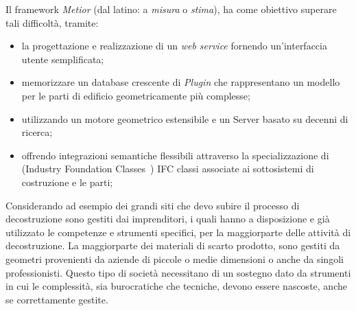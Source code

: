 

Il framework \emph{Metior} (dal latino: a \emph{misura} o \emph{stima}),
ha come obiettivo superare tali difficoltà, tramite:
\begin{itemize}
  \item la progettazione e realizzazione di un \emph{web service} fornendo un'interfaccia utente semplificata;
  \item memorizzare un database crescente di \emph{Plugin} che rappresentano un modello per le parti di edificio geometricamente più complesse;
  \item utilizzando un motore geometrico estensibile e un Server basato su decenni di ricerca;
  \item offrendo integrazioni semantiche flessibili attraverso la specializzazione di (Industry Foundation Classes~\cite{ifc})
        IFC classi associate ai sottosistemi di costruzione e le parti;
\end{itemize}



Considerando ad esempio dei grandi siti che devo subire il processo di decostruzione
sono gestiti dai imprenditori, i quali hanno a disposizione e già utilizzato le competenze e strumenti specifici,
per la maggiorparte delle attività di decostruzione. La maggiorparte dei materiali di scarto prodotto,
sono gestiti da geometri provenienti da aziende di piccole o medie dimensioni o anche da singoli professionisti.
Questo tipo di società necessitano di un sostegno dato da strumenti in cui le complessità,
sia burocratiche che tecniche, devono essere nascoste, anche se correttamente gestite.

